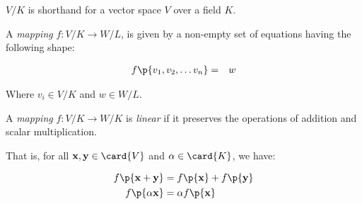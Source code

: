 \begin{notation}
$V/K$ is shorthand for a vector space $V$ over a field $K$.
\end{notation}

\begin{notation}

A \emph{mapping} $f: V/K \rightarrow W/L$, is given by a non-empty set of
equations having the following shape:

\begin{eqnarray}
f\p{v_1, v_2, \ldots v_n} &=& w
\end{eqnarray}

Where $v_i \in V/K$ and $w \in W/L$.

\end{notation}

\begin{definition}

A \emph{mapping} $f: V/K \rightarrow W/K$ is \emph{linear} if it preserves the
operations of addition and scalar multiplication.

That is, for all $\mathbf{x}, \mathbf{y} \in \card{V}$ and $\alpha \in
\card{K}$, we have:

\begin{align}
f\p{\mathbf{x}+\mathbf{y}} &= f\p{\mathbf{x}} + f\p{\mathbf{y}}\\
f\p{\alpha \mathbf{x}} &= \alpha f\p{\mathbf{x}}
\end{align}

\end{definition}
